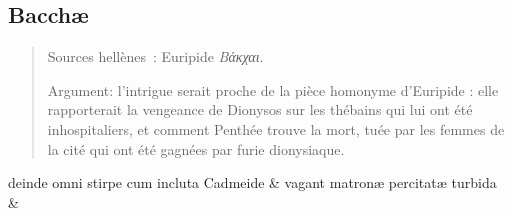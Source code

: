 \documentclass[12pt,onecolumn,twoside,a4paper]{memoir}
\begin{document}
            
               \subsection*{Bacchæ}
               \begin{abstract}
                   Sources hellènes : Euripide \textit{Βάκχαι}.\par
                  Argument: l'intrigue serait proche de la pièce homonyme d'Euripide : elle
                     rapporterait la vengeance de Dionysos sur les thébains qui lui ont été
                     inhospitaliers, et comment Penthée trouve la mort, tuée par les femmes de la
                     cité qui ont été gagnées par furie dionysiaque.\par
               \end{abstract}
               \begin{pairs}
                  \begin{Leftside}
			\beginnumbering
			\setcounter{stanzaL}{0}
                     
                         \stanza {}deinde
                              omni
                              stirpe
                              cum
                              incluta
                              Cadmeide & vagant
                              matronæ
                              percitatæ
                              turbida & 
                     

\end{Leftside}
\end{pairs}
\end{document}
